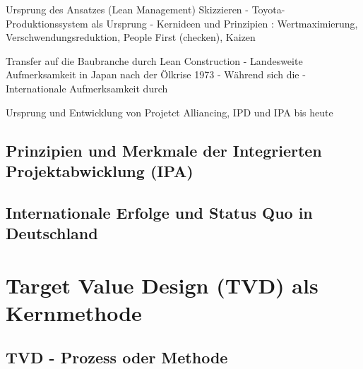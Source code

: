 Ursprung des Ansatzes (Lean Management) Skizzieren
- Toyota-Produktionssystem\autocite[]{ohno_toyota-produktionssystem_2013} als Ursprung
- Kernideen und Prinzipien : Wertmaximierung, Verschwendungsreduktion, People First (checken), Kaizen

Transfer auf die Baubranche durch Lean Construction
- Landesweite Aufmerksamkeit in Japan nach der Ölkrise 1973
- Während sich die 
- Internationale Aufmerksamkeit durch 

Ursprung und Entwicklung von Projetct Alliancing, IPD und IPA bis heute

\subsection{Prinzipien und Merkmale der Integrierten Projektabwicklung (IPA)}
\label{sec:2.2.2}

\subsection{Internationale Erfolge und Status Quo in Deutschland}
\label{sec:2.2.3}

\clearpage

\section{Target Value Design (TVD) als Kernmethode}
\label{sec: 2.3}


\subsection{TVD - Prozess oder Methode}
\label{sec: 2.3.1}

